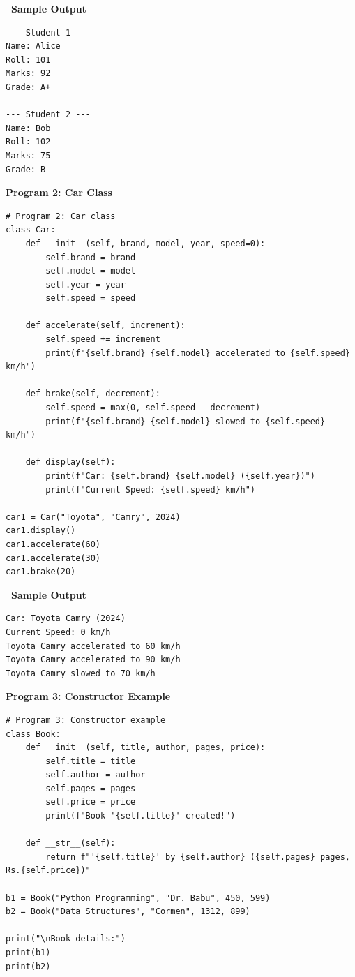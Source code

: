 \documentclass[12pt,a4paper]{article}
\newcommand{\outhead}{\noindent\colorbox{cmrgreen!25}%
  {\textbf{\small\color{cmrdark}~Sample Output~}}\par\vspace{-1pt}}
\begin{document}
\outhead
\begin{lstlisting}[style=outputstyle]
--- Student 1 ---
Name: Alice
Roll: 101
Marks: 92
Grade: A+

--- Student 2 ---
Name: Bob
Roll: 102
Marks: 75
Grade: B
\end{lstlisting}

\vspace{0.5cm}

\textbf{Program 2: Car Class}

\begin{lstlisting}
# Program 2: Car class
class Car:
    def __init__(self, brand, model, year, speed=0):
        self.brand = brand
        self.model = model
        self.year = year
        self.speed = speed

    def accelerate(self, increment):
        self.speed += increment
        print(f"{self.brand} {self.model} accelerated to {self.speed} km/h")

    def brake(self, decrement):
        self.speed = max(0, self.speed - decrement)
        print(f"{self.brand} {self.model} slowed to {self.speed} km/h")

    def display(self):
        print(f"Car: {self.brand} {self.model} ({self.year})")
        print(f"Current Speed: {self.speed} km/h")

car1 = Car("Toyota", "Camry", 2024)
car1.display()
car1.accelerate(60)
car1.accelerate(30)
car1.brake(20)
\end{lstlisting}

\outhead
\begin{lstlisting}[style=outputstyle]
Car: Toyota Camry (2024)
Current Speed: 0 km/h
Toyota Camry accelerated to 60 km/h
Toyota Camry accelerated to 90 km/h
Toyota Camry slowed to 70 km/h
\end{lstlisting}

\vspace{0.5cm}

\textbf{Program 3: Constructor Example}

\begin{lstlisting}
# Program 3: Constructor example
class Book:
    def __init__(self, title, author, pages, price):
        self.title = title
        self.author = author
        self.pages = pages
        self.price = price
        print(f"Book '{self.title}' created!")

    def __str__(self):
        return f"'{self.title}' by {self.author} ({self.pages} pages, Rs.{self.price})"

b1 = Book("Python Programming", "Dr. Babu", 450, 599)
b2 = Book("Data Structures", "Cormen", 1312, 899)

print("\nBook details:")
print(b1)
print(b2)
\end{lstlisting}
\end{document}
